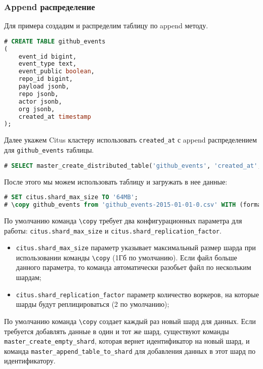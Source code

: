 \subsubsection{Append распределение}

Для примера создадим и распределим таблицу по append методу.

\begin{lstlisting}[language=SQL,label=lst:citus_append1,caption=Создание таблицы]
# CREATE TABLE github_events
(
    event_id bigint,
    event_type text,
    event_public boolean,
    repo_id bigint,
    payload jsonb,
    repo jsonb,
    actor jsonb,
    org jsonb,
    created_at timestamp
);
\end{lstlisting}

Далее укажем Citus кластеру использовать \lstinline!created_at! с append распределением для \lstinline!github_events! таблицы.

\begin{lstlisting}[language=SQL,label=lst:citus_append2,caption=Создание hash распределения]
# SELECT master_create_distributed_table('github_events', 'created_at', 'append');
\end{lstlisting}

После этого мы можем использовать таблицу и загружать в нее данные:

\begin{lstlisting}[language=SQL,label=lst:citus_append3,caption=Загрузка данных]
# SET citus.shard_max_size TO '64MB';
# \copy github_events from 'github_events-2015-01-01-0.csv' WITH (format CSV)
\end{lstlisting}

По умолчанию команда \lstinline!\copy! требует два конфигурационных параметра для работы: \lstinline!citus.shard_max_size! и \lstinline!citus.shard_replication_factor!.

\begin{itemize}
  \item \lstinline!citus.shard_max_size! параметр указывает максимальный размер шарда при использовании команды \lstinline!\copy! (1Гб по умолчанию). Если файл больше данного параметра, то команда автоматически разобьет файл по нескольким шардам;
  \item \lstinline!citus.shard_replication_factor! параметр количество воркеров, на которые шарды будут реплицироваться (2 по умолчанию);
\end{itemize}

По умолчанию команда \lstinline!\copy! создает каждый раз новый шард для данных. Если требуется добавлять данные в один и тот же шард, существуют команды \lstinline!master_create_empty_shard!, которая вернет идентификатор на новый шард, и команда \lstinline!master_append_table_to_shard! для добавления данных в этот шард по идентификатору.

